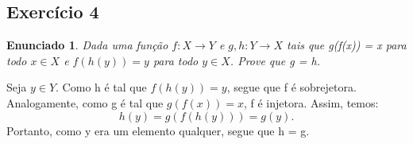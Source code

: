 \documentclass{article}
\newtheorem*{exercise*}{Enunciado}
\begin{document}
    \subsection{Exerc\'icio 4}
    \begin{exercise*}
        Dada uma fun\c c\~ao $f:X\rightarrow{Y}$ e $g, h:Y\rightarrow{X}$ tais que g(f(x)) = x 
        para todo $x\in{X}$ e $f(h(y)) = y$ para todo $y\in{X}$. Prove que g = h.
    \end{exercise*}

    Seja $y\in{Y}$. Como h \'e tal que $f(h(y)) = y$, segue que f \'e sobrejetora. Analogamente,
    como g \'e tal que $g(f(x)) = x$, f \'e injetora. Assim, temos: 
    $$
        h(y) = g(f(h(y))) = g(y).
    $$
    Portanto, como y era um elemento qualquer, segue que h = g.
    \qedsymbol
\end{document}
